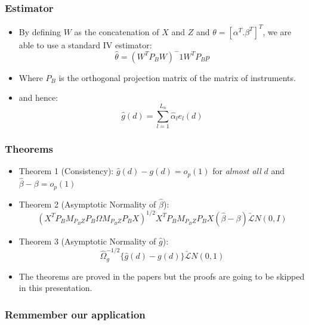 \documentclass{beamer}
\begin{document}
\begin{frame}
  \frametitle{Estimator}

  \begin{itemize}
    \item By defining $W$ as the concatenation of $X$ and $Z$ and $\theta = [\alpha^T. \beta^T]^T$, we are able to use a standard IV estimator:
      \[ \hat{\theta} = (W^TP_BW)^-1W^TP_Bp \]
    \item Where $P_B$ is the orthogonal projection matrix of the matrix of instruments.
    \item and hence:
      \[\hat{g}(d) = \sum^{L_n}_{l=1}\hat{\alpha}_le_l(d) \]
  \end{itemize}
  
\end{frame}

\begin{frame}
  \frametitle{Theorems}

  \begin{itemize}
    \item Theorem 1 (Consistency): $\hat{g}(d) - g(d) = o_p(1)$ for \textit{almost all} $d$ and $\hat{\beta} - \beta = o_p(1)$
    \item Theorem 2 (Asymptotic Normality of $\hat{\beta}$):
      \[(X^TP_BM_{P_BZ}P_B\Omega M_{P_BZ}P_BX)^{1/2}X^TP_BM_{P_BZ}P_BX(\hat{\beta} - \beta) \underrightarrow{\mathcal{L}} N(0,I)\]
    \item Theorem 3 (Asymptotic Normality of $\hat{g}$): 
      \[ \hat{\Omega}^{-1/2}_g\{\hat{g}(d) - g(d)\} \underrightarrow{\mathcal{L}} N(0,1) \]
    \item The theorems are proved in the papers but the proofs are going to be skipped in this presentation.
  \end{itemize}
\end{frame}

\begin{frame}
  \frametitle{Remmember our application}
    
  \center{}
\end{frame}
\end{document}
